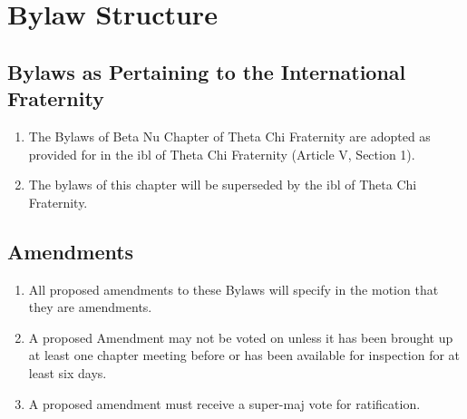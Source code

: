 \chapter{Bylaw Structure}

\section{Bylaws as Pertaining to the International Fraternity}

	\begin{enumerate}
		\item The Bylaws of Beta Nu Chapter of Theta Chi Fraternity are adopted as provided for in the \gls{ibl} of Theta Chi Fraternity (Article V, Section 1).

		\item The bylaws of this chapter will be superseded by the \gls{ibl} of Theta Chi Fraternity.
	\end{enumerate}

\section{Amendments}
\label{bylaw-amendments}
	\begin{enumerate}
		\item All proposed amendments to these Bylaws will specify in the motion that they are amendments.

		\item A proposed Amendment may not be voted on unless it has been brought up at least one chapter meeting before or has been available for inspection for at least six days.

		\item A proposed amendment must receive a \gls{super-maj} vote for ratification.

	\end{enumerate}

